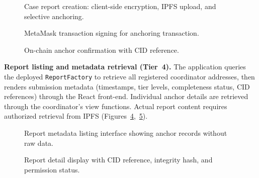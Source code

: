 \begin{figure}[!ht]
\centering
{}
\caption{Case report creation: client-side encryption, IPFS upload, and selective anchoring.}\label{fig:create1}
\end{figure}

\begin{figure}[!ht]
\centering
{}
\caption{MetaMask transaction signing for anchoring transaction.}\label{fig:create2}
\end{figure}

\begin{figure}[!ht]
\centering
{}
\caption{On-chain anchor confirmation with CID reference.}\label{fig:create3}
\end{figure}

\textbf{Report listing and metadata retrieval (Tier~4).} The application queries the deployed \texttt{ReportFactory} to retrieve all registered coordinator addresses, then renders submission metadata (timestamps, tier levels, completeness status, CID references) through the React front-end. Individual anchor details are retrieved through the coordinator's view functions. Actual report content requires authorized retrieval from IPFS (Figures~\ref{fig:list},~\ref{fig:detail}).

\begin{figure}[!ht]
\centering
{}
\caption{Report metadata listing interface showing anchor records without raw data.}\label{fig:list}
\end{figure}

\begin{figure}[!ht]
\centering
{}
\caption{Report detail display with CID reference, integrity hash, and permission status.}\label{fig:detail}
\end{figure}

